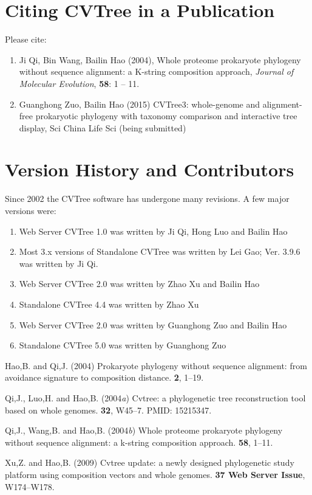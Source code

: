 \documentclass[a4paper,12pt]{article}
\begin{document}
\section{Citing CVTree in a Publication}

Please cite:
\begin{enumerate}\itemsep 0pt
\item Ji Qi, Bin Wang, Bailin Hao (2004), Whole proteome prokaryote
  phylogeny without sequence alignment: a K-string composition approach,
  {\it Journal of Molecular Evolution}, {\bf 58}: 1 -- 11.
\item Guanghong Zuo, Bailin Hao (2015) CVTree3: whole-genome and
  alignment-free prokaryotic phylogeny with taxonomy comparison and
  interactive tree display, Sci China Life Sci (being submitted)
\end{enumerate}


\section{Version History and Contributors}

Since 2002 the CVTree software has undergone many revisions. A few major
versions were:
\begin{enumerate}\itemsep 0pt
\item Web Server CVTree 1.0 was written by Ji Qi, Hong Luo and Bailin Hao
\item Most 3.x versions of Standalone CVTree was written by Lei Gao;
  Ver. 3.9.6 was written by Ji Qi.
\item Web Server CVTree 2.0 was written by Zhao Xu and Bailin Hao
\item Standalone CVTree 4.4 was written by Zhao Xu
\item Web Server CVTree 2.0 was written by Guanghong Zuo and Bailin Hao
\item Standalone CVTree 5.0 was written by Guanghong Zuo
\end{enumerate}

\begin{thebibliography}{}
Hao,B. and Qi,J. (2004{\em{}}) Prokaryote phylogeny without sequence alignment:
  from avoidance signature to composition distance.
 {\bf 2},
  1--19.

Qi,J., Luo,H.  and Hao,B. (2004{\em{a}}) Cvtree: a phylogenetic tree
  reconstruction tool based on whole genomes.
 {\bf 32}, W45--7.
\newblock PMID: 15215347.

Qi,J., Wang,B.  and Hao,B. (2004{\em{b}}) Whole proteome prokaryote phylogeny
  without sequence alignment: a k-string composition approach.
 {\bf 58}, 1--11.

Xu,Z. and Hao,B. (2009{\em{}}) Cvtree update: a newly designed phylogenetic
  study platform using composition vectors and whole genomes.
 {\bf 37 Web Server Issue}, W174--W178.
\end{thebibliography}
\end{document}
